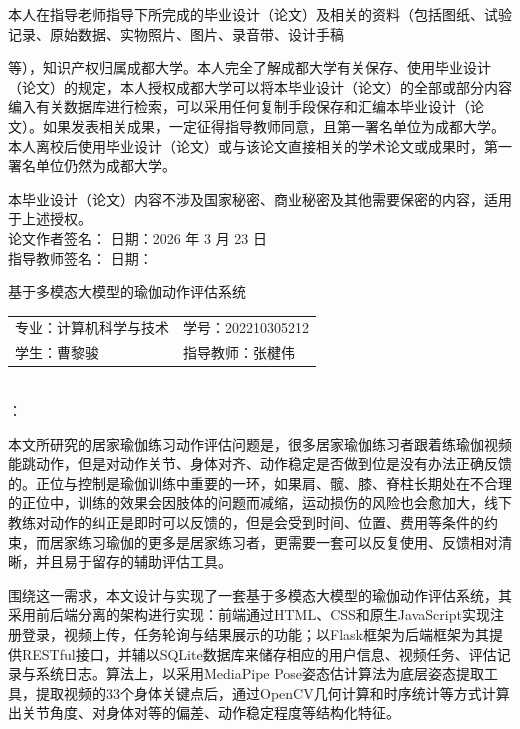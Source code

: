 \documentclass[UTF8,twoside]{ctexrep}
\makeatletter
\def@NAT@last@yr{\@citea}%
\def@NAT@last@yr{-\NAT@penalty}%
\newcommand{\TNR}[1]{{\fontspec{Times New Roman}#1}}
\newcommand{\makeAbstractPersonalInfo}[4]{%
  {%
    \setstretch{1.25}\kaishu\zihao{-4}
    \noindent\hspace*{\abstractPersonalInfoIndent}%
    \begin{tabular}{@{}l@{\hspace{3em}}l@{}}
      专业：#1 & 学号：\TNR{#2} \\[1.25em]
      学生：#3 & 指导教师：#4 \\[1.25em]
    \end{tabular}
  }\\
}
\newcommand{\makeChineseAbstractHeader}[5]{%
  \clearpage
  \begin{center}
    {\setstretch{1.5}\heiti\zihao{-2}#1\par}
  \end{center}
  \vspace{12pt}
  \makeAbstractPersonalInfo{#2}{#3}{#4}{#5}
}
\newcommand{\ChineseAbstractTextStart}{%
  \noindent {\heiti\zihao{-4} 摘要}：\begingroup\songti\zihao{-4}\ignorespaces
}
\newcommand{\abstractPersonalInfoIndent}{8em}
\newcommand{\authorSignature}{曹黎骏}
\newcommand{\thesisDeclarationDate}{2026 年 3 月 23 日}
\makeatother
\begin{document}
{\declarationbodyfont

\indent 本人在指导老师指导下所完成的毕业设计（论文）及相关的资\nobreak 料\nobreak（包括图纸、试验记录、原始数据、实物照片、图片、录音带、设计手稿

\noindent 等），知识产权归属成都大学。本人完全了解成都大学有关保存、使用毕业设计（论文）的规定，本人授权成都大学可以将本毕业设计\nobreak（论文）的全部或部分内容编入有关数据库进行检索，可以采用任何复制手段保存和汇编本毕业设计（论文）。如果发表相关成果，一定征得指导教师同意，且第一署名单位为成都大学。本人离校后使用毕业设计\nobreak（论文）或与该论文直接相关的学术论文或成果时，第一署名单位仍然为成都大学。

\indent 本毕业设计（论文）内容不涉及国家秘密、商业秘密及其他需要保密的内容，适用于上述授权。\\

\indent 论文作者签名：\signaturefield{\authorSignature} 日\quad 期：\thesisDeclarationDate\\[2ex]


\indent 指导教师签名：\signaturefield{} 日\quad 期：\\
}%
\makeChineseAbstractHeader
  {基于多模态大模型的瑜伽动作评估系统}
  {计算机科学与技术}
  {202210305212}
  {曹黎骏}
  {张楗伟}
\ChineseAbstractTextStart
本文所研究的居家瑜伽练习动作评估问题是，很多居家瑜伽练习者跟着练瑜伽视频能跳动作，但是对动作关节、身体对齐、动作稳定是否做到位是没有办法正确反馈的。正位与控制是瑜伽训练中重要的一环，如果肩、髋、膝、脊柱长期处在不合理的正位中，训练的效果会因肢体的问题而减缩，运动损伤的风险也会愈加大，线下教练对动作的纠正是即时可以反馈的，但是会受到时间、位置、费用等条件的约束，而居家练习瑜伽的更多是居家练习者，更需要一套可以反复使用、反馈相对清晰，并且易于留存的辅助评估工具。

围绕这一需求，本文设计与实现了一套基于多模态大模型的瑜伽动作评估系统，其采用前后端分离的架构进行实现：前端通过HTML、CSS和原生JavaScript实现注册登录，视频上传，任务轮询与结果展示的功能；以Flask框架为后端框架为其提供RESTful接口，并辅以SQLite数据库来储存相应的用户信息、视频任务、评估记录与系统日志。算法上，以采用MediaPipe Pose姿态估计算法为底层姿态提取工具，提取视频的33个身体关键点后，通过OpenCV几何计算和时序统计等方式计算出关节角度、对身体对等的偏差、动作稳定程度等结构化特征。
\end{document}
